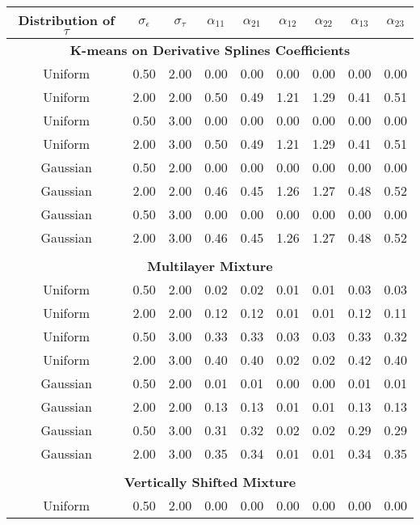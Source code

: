 \documentclass[12pt]{article}
\begin{document}
\begin{table}[ht]
\begin{center}
\begin{tabular}{ccc|cccccc}
  \hline Distribution of $\tau$&$\sigma_{\epsilon}$&$\sigma_{\tau}$&$\alpha_{11}$&$\alpha_{21}$&$\alpha_{12}$&$\alpha_{22}$&$\alpha_{13}$&$\alpha_{23}$\\  \hline\multicolumn{9}{c}{\textbf{K-means on Derivative Splines Coefficients}}\\ Uniform & 0.50 & 2.00 & 0.00 & 0.00 & 0.00 & 0.00 & 0.00 & 0.00 \\ 
  Uniform & 2.00 & 2.00 & 0.50 & 0.49 & 1.21 & 1.29 & 0.41 & 0.51 \\ 
  Uniform & 0.50 & 3.00 & 0.00 & 0.00 & 0.00 & 0.00 & 0.00 & 0.00 \\ 
  Uniform & 2.00 & 3.00 & 0.50 & 0.49 & 1.21 & 1.29 & 0.41 & 0.51 \\ 
  Gaussian & 0.50 & 2.00 & 0.00 & 0.00 & 0.00 & 0.00 & 0.00 & 0.00 \\ 
  Gaussian & 2.00 & 2.00 & 0.46 & 0.45 & 1.26 & 1.27 & 0.48 & 0.52 \\ 
  Gaussian & 0.50 & 3.00 & 0.00 & 0.00 & 0.00 & 0.00 & 0.00 & 0.00 \\ 
  Gaussian & 2.00 & 3.00 & 0.46 & 0.45 & 1.26 & 1.27 & 0.48 & 0.52 \\ 
   \\ \multicolumn{9}{c}{\textbf{Multilayer Mixture}}\\Uniform & 0.50 & 2.00 & 0.02 & 0.02 & 0.01 & 0.01 & 0.03 & 0.03 \\ 
  Uniform & 2.00 & 2.00 & 0.12 & 0.12 & 0.01 & 0.01 & 0.12 & 0.11 \\ 
  Uniform & 0.50 & 3.00 & 0.33 & 0.33 & 0.03 & 0.03 & 0.33 & 0.32 \\ 
  Uniform & 2.00 & 3.00 & 0.40 & 0.40 & 0.02 & 0.02 & 0.42 & 0.40 \\ 
  Gaussian & 0.50 & 2.00 & 0.01 & 0.01 & 0.00 & 0.00 & 0.01 & 0.01 \\ 
  Gaussian & 2.00 & 2.00 & 0.13 & 0.13 & 0.01 & 0.01 & 0.13 & 0.13 \\ 
  Gaussian & 0.50 & 3.00 & 0.31 & 0.32 & 0.02 & 0.02 & 0.29 & 0.29 \\ 
  Gaussian & 2.00 & 3.00 & 0.35 & 0.34 & 0.01 & 0.01 & 0.34 & 0.35 \\ 
   \\ \multicolumn{9}{c}{\textbf{Vertically Shifted Mixture}}\\Uniform & 0.50 & 2.00 & 0.00 & 0.00 & 0.00 & 0.00 & 0.00 & 0.00 \\ 

\end{tabular}
\end{center}
\end{table}
\end{document}
